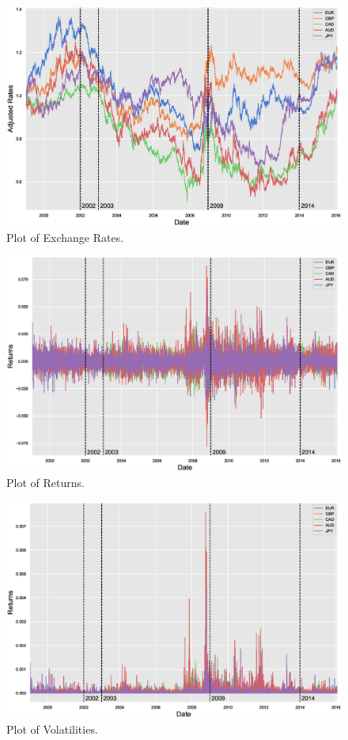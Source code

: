 	\begin{figure}[!ht]
	\centering
	\includegraphics[width=\textwidth]{chapters/chapter_mvts/figures/pexchrate.eps}
	\caption{Plot of Exchange Rates. \label{fig:pexchrate}}
	\end{figure}
	
	\begin{figure}[!ht]
	\centering
	\includegraphics[width=\textwidth]{chapters/chapter_mvts/figures/preturns.eps}
	\caption{Plot of Returns. \label{fig:preturns}}
	\end{figure}
	
	\begin{figure}[!ht]
	\centering
	\includegraphics[width=\textwidth]{chapters/chapter_mvts/figures/pvolat.eps}
	\caption{Plot of Volatilities. \label{fig:pvolat}}
	\end{figure}


